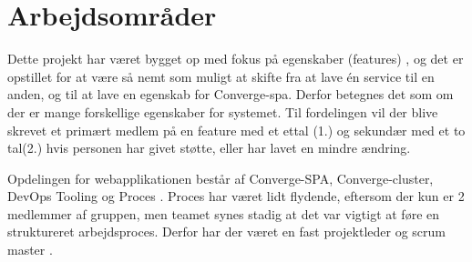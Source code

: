 \section{Arbejdsområder}

Dette projekt har været bygget op med fokus på egenskaber (features) \cite[Features]{converge-terms}, og det er opstillet for at være så nemt som muligt at skifte fra at lave én service \cite[Service]{converge-terms} til en anden, og til at lave en egenskab for Converge-spa. Derfor betegnes det som om der er mange forskellige egenskaber for systemet. Til fordelingen vil der blive skrevet et primært medlem på en feature med et ettal (1.) og sekundær med et to tal(2.) hvis personen har givet støtte, eller har lavet en mindre ændring.

Opdelingen for webapplikationen \cite[Webapplikationen]{converge-terms} består af Converge-SPA, Converge-cluster, DevOps Tooling og Proces \cite[DevOps Tooling and Proces]{converge-terms}. Proces har været lidt flydende, eftersom der kun er 2 medlemmer af gruppen, men teamet synes stadig at det var vigtigt at føre en struktureret arbejdsproces. Derfor har der været en fast projektleder \cite[Projektleder]{converge-terms} og scrum master \cite[Scrum master]{converge-terms}.

